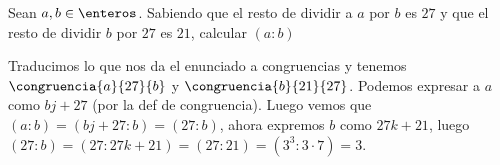 \begin{enunciado}{\ejercicio}
Sean $a,b \in \enteros$. Sabiendo que el resto de dividir a $a$ por $b$ es $27$ y que el resto de dividir $b$ por $27$ 
es $21$, calcular $(a:b)$
\end{enunciado}

Traducimos lo que nos da el enunciado a congruencias y tenemos $\congruencia{a}{27}{b}$ y $\congruencia{b}{21}{27}$. 
Podemos expresar a $a$ como $bj + 27$ (por la def de congruencia). Luego vemos que $(a:b) = (bj + 27 : b)
= (27:b)$, ahora expremos $b$ como $27k + 21$, luego $(27:b) = (27: 27k + 21) = (27:21) = (3^3:3 \cdot 7) = 3$. 

\begin{aportes}
 \item {}
\end{aportes}
